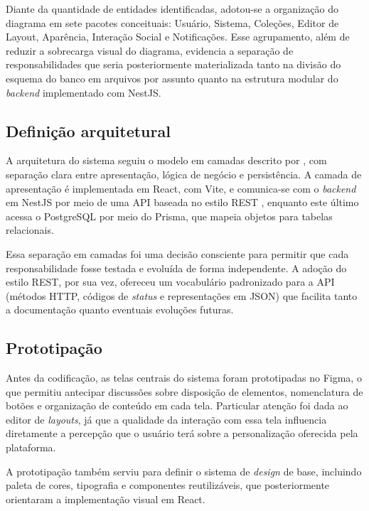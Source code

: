 Diante da quantidade de entidades identificadas, adotou-se a organização do diagrama em sete pacotes conceituais: Usuário, Sistema, Coleções, Editor de Layout, Aparência, Interação Social e Notificações. Esse agrupamento, além de reduzir a sobrecarga visual do diagrama, evidencia a separação de responsabilidades que seria posteriormente materializada tanto na divisão do esquema do banco em arquivos por assunto quanto na estrutura modular do \textit{backend} implementado com NestJS.

\subsection{Definição arquitetural}
\label{subsec:definicaoArquitetural}

A arquitetura do sistema seguiu o modelo em camadas descrito por \cite{Fowler2002}, com separação clara entre apresentação, lógica de negócio e persistência. A camada de apresentação é implementada em React, com Vite, e comunica-se com o \textit{backend} em NestJS por meio de uma API baseada no estilo REST \cite{Fielding2000}, enquanto este último acessa o PostgreSQL por meio do Prisma, que mapeia objetos para tabelas relacionais.

Essa separação em camadas foi uma decisão consciente para permitir que cada responsabilidade fosse testada e evoluída de forma independente. A adoção do estilo REST, por sua vez, ofereceu um vocabulário padronizado para a API (métodos HTTP, códigos de \textit{status} e representações em JSON) que facilita tanto a documentação quanto eventuais evoluções futuras.

\subsection{Prototipação}

Antes da codificação, as telas centrais do sistema foram prototipadas no Figma, o que permitiu antecipar discussões sobre disposição de elementos, nomenclatura de botões e organização de conteúdo em cada tela. Particular atenção foi dada ao editor de \textit{layouts}, já que a qualidade da interação com essa tela influencia diretamente a percepção que o usuário terá sobre a personalização oferecida pela plataforma.

A prototipação também serviu para definir o sistema de \textit{design} de base, incluindo paleta de cores, tipografia e componentes reutilizáveis, que posteriormente orientaram a implementação visual em React.


